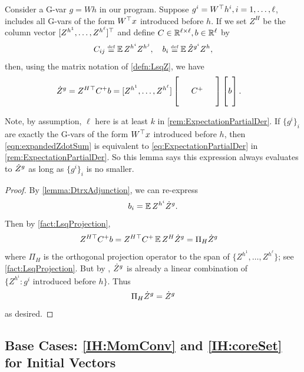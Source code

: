 \documentclass[main.tex]{subfiles}
\begin{document}
\begin{lemma}\label{lemma:conjugatePairDtrxh}
  Consider a G-var $g = Wh$ in our program.
  Suppose $g^i = W^\top h^i, i=1,\ldots,\ell$, includes all G-vars of the form $W^\top x$ introduced before $h$.
  If we set $ Z^{H}$ be the column vector $[Z^{h^1},
  \ldots,
  Z^{h^\ell}]^\top$ and define $C \in\mathbb{R}^{\ell\times \ell}, b \in \mathbb{R}^\ell$ by
  \[C_{ij} \defeq \EV Z^{h^i} Z^{h^j},\quad b_i \defeq \EV \Zhat^{g^i} Z^h,\]
  then, using the matrix notation of \cref{defn:LsqZ}, we have
  \begin{align}
  \Zdot^{g} &= 
     Z^{H}{}^\trsp C^+ b =
  [Z^{h^1},
  \ldots,
   Z^{h^\ell}]
  \begin{bmatrix}
  \phz
    &\phz
      &\phz\\
  \phz
    &C^+
      &\phz\\
  \phz
    &\phz
      &\phz
  \end{bmatrix}
  \begin{bmatrix}
  \phz\\
  b\\
  \phz
  \end{bmatrix}
  \label{eqn:expandedZdotSum}
  .
  \end{align}
\end{lemma}
Note, by assumption, $\ell$ here is at least $k$ in \cref{rem:ExpectationPartialDer}.
If $\{g^i\}_i$ are exactly the G-vars of the form $W^\top x$ introduced before $h$, then \cref{eqn:expandedZdotSum} is equivalent to \cref{eq:ExpectationPartialDer} in \cref{rem:ExpectationPartialDer}.
So this lemma says this expression always evaluates to $\dot Z^g$ as long as $\{g^i\}_i$ is no smaller.
\begin{proof}
  By \cref{lemma:DtrxAdjunction}, we can re-express
  \[b_i = \operatorname*{\mathbb{E}}   Z^{h^i} \dot Z^{g}.\]
  Then by \cref{fact:LsqProjection},
  \begin{align*}
  Z^{H\top } C^+ b
    &=
      Z^{H}{}^\top C^+ \operatorname*{\mathbb{E}} Z^{H} \dot Z^{g}
    =
      \Pi_H \dot Z^{g}
  \end{align*}
  where $\Pi_H$ is the orthogonal projection operator to the span of $\{ Z^{h^1},
  \ldots,
  Z^{h^\ell}\}$; see \cref{fact:LsqProjection}.
  But by , $\dot Z^{g}$ is already a linear combination of $\{Z^{h^i}: g^i\text{ introduced before $h$}\}$.
  Thus
  \[ \Pi_H \dot Z^{g} = \dot Z^{g}\]
  as desired.
\end{proof}

\subsection{Base Cases: \ref{IH:MomConv} and \ref{IH:coreSet} for Initial Vectors}
\label{sec:basecases}
\end{document}
